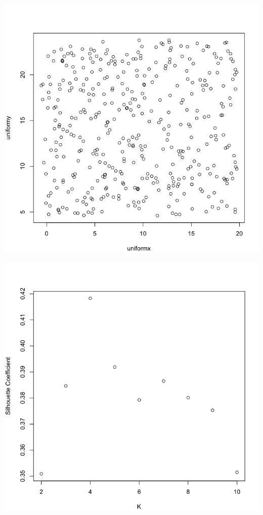 \documentclass[11pt]{article}
\begin{document}
\begin{enumerate}
\begin{enumerate}
\begin{center}
\includegraphics[scale=0.35]{pix/uniform_pts}
\end{center}

\begin{center}
\includegraphics[scale=0.35]{pix/silhouette_for_uniform}
\end{center}


\end{enumerate}
\end{enumerate}
\end{document}

